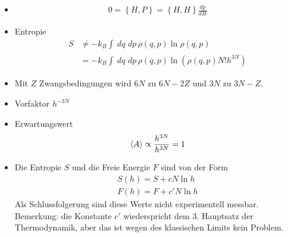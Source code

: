 \documentclass[11pt]{article}
\theoremstyle{plain}
\theoremstyle{mytheoremstyle}
\newcommand{\dd}[2]{\frac{d{#1}}{d{#2}}}
\renewcommand{\d}[1]{\,d#1\,}
\begin{document}
\begin{itemize}
  \item %
    \begin{align*}
      0 = \left\{ H,P \right\} = \left\{ H, H \right\} \dd{p}{H}
    \end{align*}
  \item Entropie 
    \begin{align*}
      S & \neq - k_B \int_{}^{} \d{q} \d{p} \rho(q,p) \ln{\rho(q,p)} \\
        & = -k_B \int_{}^{} \d{q} \d{p} \rho(q,p) \ln{\left( 
  \rho(q,p) N! h^{3N}\right)}
    \end{align*}
  \item Mit $Z$ Zwangsbedingungen wird $6N$ zu $6N - 2Z$ und $3N$ zu $3N - Z$.
  \item Vorfaktor $h^{-3N}$
  \item Erwartungswert 
    \begin{align*}
      \Braket{A} \propto \frac{h^{3N}}{h^{3N}} = 1
    \end{align*}
  \item Die Entropie $S$ und die Freie Energie $F$ sind von der Form
    \begin{align*}
      S(h) = S + c N \ln{h} \\
      F(h) = F + c' N \ln{h}
    \end{align*}
    Als Schlussfolgerung sind diese Werte nicht experimentell messbar.
    Bemerkung: die Konstante $c'$ wiederspricht dem 3. Hauptsatz der
    Thermodynamik, aber das ist wegen des klassischen Limits kein Problem.
\end{itemize}
\end{document}

